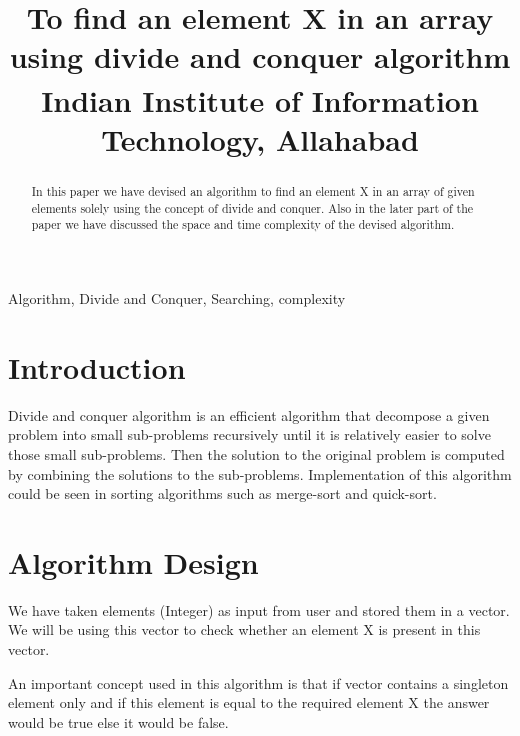 \documentclass[conference]{IEEEtran}
\begin{document}
\title{To find an element X in an array using divide and conquer algorithm\\
{\footnotesize \textsuperscript {} Indian Institute of Information Technology, Allahabad}
}

\author{
\and
{}
\and
{}
}

\maketitle

\begin{abstract}
 In this paper we have devised an algorithm to find an element X in an array of given elements solely using the concept of divide and conquer. Also in the later part of the paper we have discussed the space and time complexity of the devised algorithm.
\end{abstract}

\begin{IEEEkeywords}
Algorithm, Divide and Conquer, Searching, complexity
\end{IEEEkeywords}

\section{Introduction}
Divide and conquer algorithm is an efficient algorithm that decompose a given problem into small sub-problems recursively until it is relatively easier to solve those small sub-problems. Then the solution to the original problem is computed by combining the solutions to the sub-problems. Implementation of this algorithm could be seen in sorting algorithms such as merge-sort and quick-sort. 

\section{Algorithm Design}
We have taken elements (Integer) as input from user and stored them in a vector. We will be using this vector to check whether an element X is present in this vector.

An important concept used in this algorithm is that if vector contains a singleton element only and if this element is equal to the required element X the answer would be true else it would be false.
\end{document}

